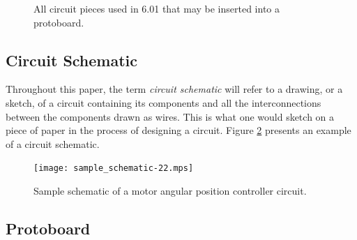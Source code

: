 \begin{figure}
\begin{center}
\hspace{3cm}
\caption[Circuit pieces]{All circuit pieces used in 6.01 that may be
inserted into a protoboard.}
\label{fig:components}
\end{center}
\end{figure}

\subsection{Circuit Schematic}

Throughout this paper, the term \textit{circuit schematic} will refer to a
drawing, or a sketch, of a circuit containing its components and all the
interconnections between the components drawn as wires. This is what one would
sketch on a piece of paper in the process of designing a circuit. Figure
\ref{fig:schematic} presents an example of a circuit schematic.

\begin{figure}
\begin{center}
\texttt{[image: sample\_schematic-22.mps]}
\caption[Sample circuit schematic]{Sample schematic of a motor angular position
controller circuit.}
\label{fig:schematic}
\end{center}
\end{figure}

\subsection{Protoboard}
\label{sec:what_is_protoboard}

